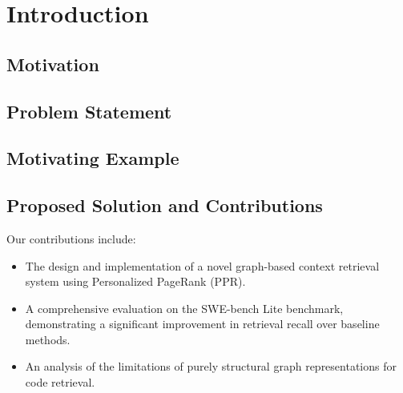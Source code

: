 \chapter{Introduction}
\label{chap:introduction}

\section{Motivation}
\label{sec:motivation}

\section{Problem Statement}
\label{sec:problem-statement}

\section{Motivating Example}
\label{sec:motivating-example}

\section{Proposed Solution and Contributions}
\label{sec:solution-contributions}
Our contributions include:
\begin{itemize}
    \item The design and implementation of a novel graph-based context retrieval system using Personalized PageRank (PPR).
    \item A comprehensive evaluation on the SWE-bench Lite benchmark, demonstrating a significant improvement in retrieval recall over baseline methods.
    \item An analysis of the limitations of purely structural graph representations for code retrieval.
\end{itemize}

